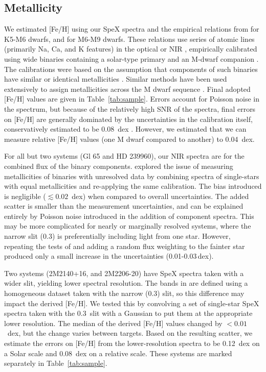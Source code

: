 \documentclass[twocolumn]{aastex62}
\begin{document}
\subsection{Metallicity}\label{sec:feh}

We estimated [Fe/H] using our SpeX spectra and the empirical relations from \citet{Mann2013a} for K5-M6 dwarfs, and \citet{Mann2014} for M6-M9 dwarfs. These relations use series of atomic lines (primarily Na, Ca, and K features) in the optical or NIR \citep[e.g.,][]{RojasAyala:2010,Terrien:2012lr}, empirically calibrated using wide binaries containing a solar-type primary and an M-dwarf companion \citep[e.g.,][]{Bonfils:2005,Johnson2009,Neves2012}. The calibrations were based on the assumption that components of such binaries have similar or identical metallicities \citep[e.g.,][]{2015ApJ...801L..10T}. Similar methods have been used extensively to assign metallicities across the M dwarf sequence \citep[e.g.,][]{Terrien2015,Muirhead2015,Dressing2017,2018ApJ...853...30V,2018ApJ...854..145M}. Final adopted [Fe/H] values are given in Table~\ref{tab:sample}. Errors account for Poisson noise in the spectrum, but because of the relatively high SNR of the spectra, final errors on [Fe/H] are generally dominated by the uncertainties in the calibration itself, conservatively estimated to be 0.08~dex \citep{Mann2013a,Mann2014}. However, we estimated that we can measure relative [Fe/H] values (one M dwarf compared to another) to 0.04~dex. 

For all but two systems (Gl 65 and HD 239960), our NIR spectra are for the combined flux of the binary components. \citet{Mann2014} explored the issue of measuring metallicities of binaries with unresolved data by combining spectra of single-stars with equal metallicities and re-applying the same calibration. The bias introduced is negligible ($\lesssim0.02$~dex) when compared to overall uncertainties. The added scatter is smaller than the measurement uncertainties, and can be explained entirely by Poisson noise introduced in the addition of component spectra. This may be more complicated for nearly or marginally resolved systems, where the narrow slit (0.3\arcsec) is preferentially including light from one star. However, repeating the tests of \citet{Mann2014} and adding a random flux weighting to the fainter star produced only a small increase in the uncertainties (0.01-0.03\,dex).

Two systems (2M2140+16, and 2M2206-20) have SpeX spectra taken with a wider slit, yielding lower spectral resolution. The bands in \citet{Mann2014} are defined using a homogeneous dataset taken with the narrow (0.3\arcsec) slit, so this difference may impact the derived [Fe/H]. We tested this by convolving a set of single-star SpeX spectra taken with the 0.3\arcsec\ slit with a Gaussian to put them at the appropriate lower resolution. The median of the derived [Fe/H] values changed by $<0.01$~dex, but the change varies between targets. Based on the resulting scatter, we estimate the errors on [Fe/H] from the lower-resolution spectra to be 0.12~dex on a Solar scale and 0.08~dex on a relative scale. These systems are marked separately in Table~\ref{tab:sample}. 
\end{document}
